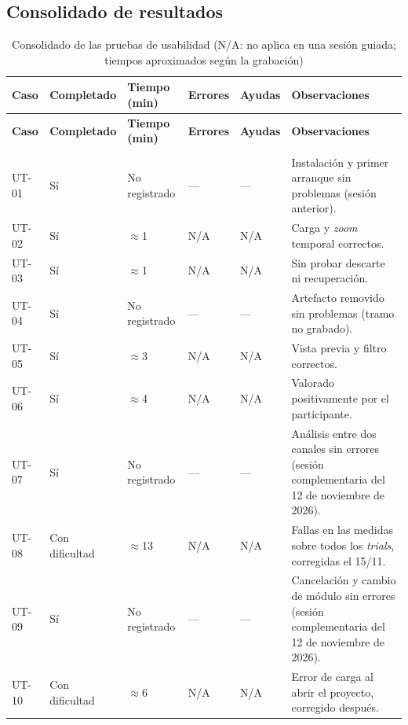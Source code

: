 \documentclass[12pt,letterpaper,oneside]{article}
\DeclareRobustCommand{\_}{\textunderscore\allowbreak}
\newcommand{\fechasesionmunera}{12 de noviembre de 2026}
\begin{document}
\subsection{Consolidado de resultados}

\begin{center}
\footnotesize
\begin{longtable}{|>{\raggedright\arraybackslash}p{}|>{\centering\arraybackslash}p{}|>{\centering\arraybackslash}p{}|>{\centering\arraybackslash}p{}|>{\centering\arraybackslash}p{}|>{\raggedright\arraybackslash}p{}|}
\hline
\textbf{Caso} & \textbf{Completado} & \textbf{Tiempo (min)} & \textbf{Errores} & \textbf{Ayudas} & \textbf{Observaciones} \\
\hline
\endfirsthead
\hline
\textbf{Caso} & \textbf{Completado} & \textbf{Tiempo (min)} & \textbf{Errores} & \textbf{Ayudas} & \textbf{Observaciones} \\
\hline
\endhead
\hline
\endfoot
\hline
\caption{Consolidado de las pruebas de usabilidad (N/A: no aplica en una sesión guiada; tiempos aproximados según la grabación)} \label{tab:td_ut_consolidado} \\
\endlastfoot
UT-01 & Sí & No registrado & --- & --- & Instalación y primer arranque sin problemas (sesión anterior). \\
\hline
UT-02 & Sí & $\approx$1 & N/A & N/A & Carga y \textit{zoom} temporal correctos. \\
\hline
UT-03 & Sí & $\approx$1 & N/A & N/A & Sin probar descarte ni recuperación. \\
\hline
UT-04 & Sí & No registrado & --- & --- & Artefacto removido sin problemas (tramo no grabado). \\
\hline
UT-05 & Sí & $\approx$3 & N/A & N/A & Vista previa y filtro correctos. \\
\hline
UT-06 & Sí & $\approx$4 & N/A & N/A & Valorado positivamente por el participante. \\
\hline
UT-07 & Sí & No registrado & --- & --- & Análisis entre dos canales sin errores (sesión complementaria del \fechasesionmunera{}). \\
\hline
UT-08 & Con dificultad & $\approx$13 & N/A & N/A & Fallas en las medidas sobre todos los \textit{trials}, corregidas el 15/11. \\
\hline
UT-09 & Sí & No registrado & --- & --- & Cancelación y cambio de módulo sin errores (sesión complementaria del \fechasesionmunera{}). \\
\hline
UT-10 & Con dificultad & $\approx$6 & N/A & N/A & Error de carga al abrir el proyecto, corregido después. \\
\hline
\end{longtable}
\end{center}
\end{document}
